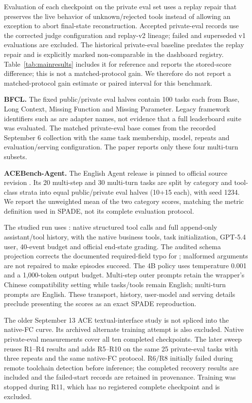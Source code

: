 Evaluation of each checkpoint on the private eval set uses a replay repair that preserves the live behavior of unknown/rejected tools instead of allowing an exception to abort final-state reconstruction. Accepted private-eval records use the corrected judge configuration and replay-v2 lineage; failed and superseded v1 evaluations are excluded. The historical private-eval baseline predates the replay repair and is explicitly marked non-comparable in the dashboard registry. Table~\ref{tab:mainresults} includes it for reference and reports the stored-score difference; this is not a matched-protocol gain. We therefore do not report a matched-protocol gain estimate or paired interval for this benchmark.

\textbf{BFCL.}\quad
The fixed public/private eval halves contain 100 tasks each from Base, Long Context, Missing Function and Missing Parameter. Legacy framework identifiers such as  are adapter names, not evidence that a full leaderboard suite was evaluated. The matched private-eval base comes from the recorded September 6 collection with the same task membership, model, repeats and evaluation/serving configuration. The paper reports only these four multi-turn subsets.

\textbf{ACEBench-Agent.}\quad
The English Agent release is pinned to official source revision . Its 20 multi-step and 30 multi-turn tasks are split by category and tool-class strata into equal public/private eval halves (10+15 each), with seed 1234. We report the unweighted mean of the two category scores, matching the metric definition used in SPADE, not its complete evaluation protocol.

The studied run uses : native structured tool calls and full append-only assistant/tool history, with the native business tools, task initialization, GPT-5.4 user, 40-event budget and official end-state grading. The audited schema projection corrects the documented required-field typo for ; malformed arguments are not repaired to make episodes succeed. The 4B policy uses temperature 0.001 and a 1,000-token output budget. Multi-step outer prompts retain the wrapper's Chinese compatibility setting while tasks/tools remain English; multi-turn prompts are English. These transport, history, user-model and serving details preclude presenting the scores as an exact SPADE reproduction.

The older September 13 ACE textual-interface study is not spliced into the native-FC curve. Its archived alternate training attempt is also excluded. Native private-eval measurements cover all ten completed checkpoints. The later sweep reuses R1--R4 results and adds R5--R10 on the same 25 private-eval tasks with three repeats and the same native-FC protocol. R6/R8 initially failed during remote toolchain detection before inference; the completed recovery results are included and the failed-start records are retained in provenance. Training was stopped during R11, which has no registered complete checkpoint and is excluded.

